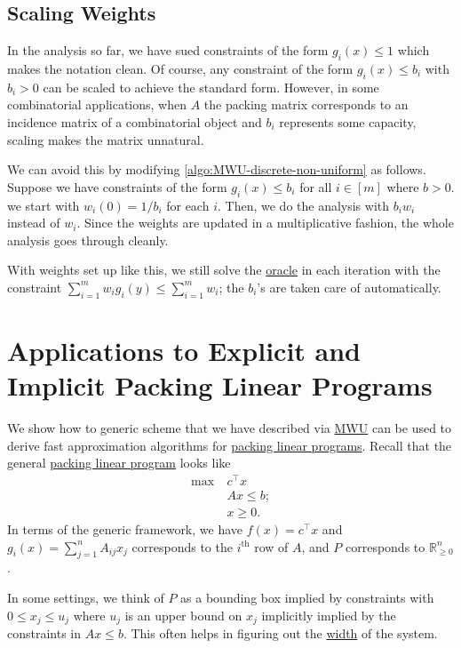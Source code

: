 \subsection{Scaling Weights}
In the analysis so far, we have sued constraints of the form \(g_i(x) \leq 1\) which makes the notation clean. Of course, any constraint of the form \(g_i(x) \leq b_i\) with \(b_i > 0\) can be scaled to achieve the standard form. However, in some combinatorial applications, when \(A\) the packing matrix corresponds to an incidence matrix of a combinatorial object and \(b_i\) represents some capacity, scaling makes the matrix unnatural.

We can avoid this by modifying \autoref{algo:MWU-discrete-non-uniform} as follows. Suppose we have constraints of the form \(g_i(x) \leq b_i\) for all \(i \in [m]\) where \(b > 0\). we start with \(w_i(0) = 1 / b_i\) for each \(i\). Then, we do the analysis with \(b_i w_i\) instead of \(w_i\). Since the weights are updated in a multiplicative fashion, the whole analysis goes through cleanly.

\begin{note}
	With weights set up like this, we still solve the \hyperref[eq:MWU-oracle]{oracle} in each iteration with the constraint \(\sum_{i=1}^{m} w_i g_i(y) \leq \sum_{i=1}^{m} w_i\); the \(b_i\)'s are taken care of automatically.
\end{note}

\section{Applications to Explicit and Implicit Packing Linear Programs}
We show how to generic scheme that we have described via \hyperref[algo:MWU-discrete-non-uniform]{MWU} can be used to derive fast approximation algorithms for \hyperref[def:packing-LP]{packing linear programs}. Recall that the general \hyperref[def:packing-LP]{packing linear program} looks like
\[
	\begin{aligned}
		\max~ & c^{\top} x  \\
		      & Ax \leq b ; \\
		      & x \geq 0.
	\end{aligned}
\]
In terms of the generic framework, we have \(f(x) = c^{\top} x\) and \(g_i(x) = \sum_{j=1}^{n} A_{ij} x_j\) corresponds to the \(i^{\text{th} }\) row of \(A\), and \(P\) corresponds to \(\mathbb{R} _{\geq 0}^n\).

\begin{note}
	In some settings, we think of \(P\) as a bounding box implied by constraints with \(0 \leq x_j \leq u_j\) where \(u_j\) is an upper bound on \(x_j\) implicitly implied by the constraints in \(Ax \leq b\). This often helps in figuring out the \hyperref[def:width]{width} of the system.
\end{note}

